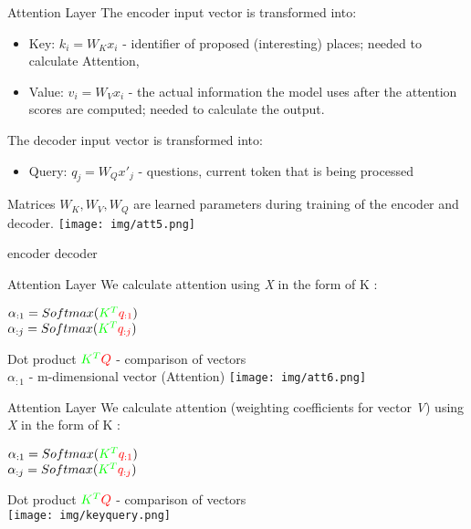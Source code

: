 \documentclass{beamer}
\begin{document}
\begin{frame}{Attention Layer}
The encoder input vector is transformed into:
\begin{itemize}
\item \color{green}Key: \color{black} $k_i=W_K x_i$ - identifier of proposed (interesting) places; needed to calculate Attention,
\item \color{blue}Value: \color{black} $v_i=W_V x_i$ - the actual information the model uses after the attention scores are computed; needed to calculate the output.
\end{itemize}
The decoder input vector is transformed into:
\begin{itemize}
\item \color{red}Query: \color{black} $q_j=W_Q x'_j$ - questions, current token that is being processed
\end{itemize}
Matrices $W_K, W_V, W_Q$ are learned parameters during training of the encoder and decoder.
\texttt{[image: img/att5.png]} 
\begin{center}
 encoder \hspace{5cm} decoder
\end{center}
\end{frame}

\begin{frame}{Attention Layer}
We calculate attention using \textit{X} in the form of \color{green}K \color{black}: \\
\begin{center}
$\alpha_{:1}=Softmax(\color{green}K^T \color{red}q_{:1} \color{black})$\\
$\alpha_{:j}=Softmax(\color{green}K^T \color{red}q_{:j} \color{black})$\\
\end{center}
Dot product $\color{green}K^T \color{red}Q \color{black}$ - comparison of vectors\\
$\alpha_{:1}$ - m-dimensional vector (Attention)
\texttt{[image: img/att6.png]} 
\end{frame}

\begin{frame}{Attention Layer}
We calculate attention (weighting coefficients for vector \textit{V}) using \textit{X} in the form of \color{green}K \color{black}: \\
\begin{center}
$\alpha_{:1}=Softmax(\color{green}K^T \color{red}q_{:1} \color{black})$\\
$\alpha_{:j}=Softmax(\color{green}K^T \color{red}q_{:j} \color{black})$\\
\end{center}
Dot product $\color{green}K^T \color{red}Q \color{black}$ - comparison of vectors\\
\texttt{[image: img/keyquery.png]} 
\end{frame}
\end{document}
